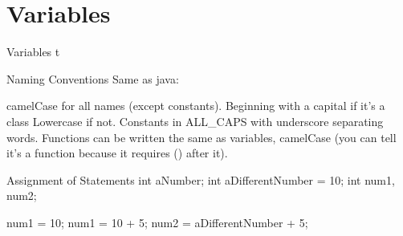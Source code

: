 \documentclass[../lecture2-variablesandcontrolstructures.tex]{subfiles}
\begin{document}
\section{Variables}


\begin{frame}[fragile]{Variables}
t
\end{frame}


\begin{frame}[fragile]{Naming Conventions}
Same as java:

camelCase for all names (except constants).
Beginning with a capital if it's a class
Lowercase if not.
Constants in ALL_CAPS with underscore separating words.
Functions can be written the same as variables, camelCase (you can tell it's a function because it requires () after it).
\end{frame}


\begin{frame}[fragile]{Assignment of Statements}
int aNumber;
int aDifferentNumber = 10;
int num1, num2;

num1 = 10;
num1 = 10 + 5;
num2 = aDifferentNumber + 5;
\end{frame}

\end{document}
